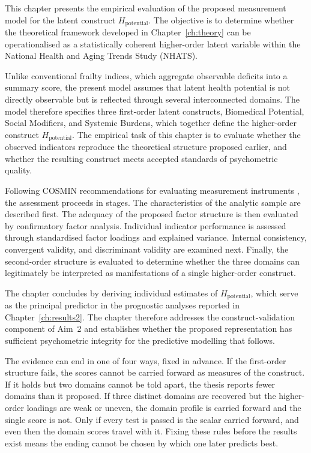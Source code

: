 This chapter presents the empirical evaluation of the proposed measurement model for the latent construct $H_{\text{potential}}$. The objective is to determine whether the theoretical framework developed in Chapter~\ref{ch:theory} can be operationalised as a statistically coherent higher-order latent variable within the National Health and Aging Trends Study (NHATS).

Unlike conventional frailty indices, which aggregate observable deficits into a summary score, the present model assumes that latent health potential is not directly observable but is reflected through several interconnected domains. The model therefore specifies three first-order latent constructs, Biomedical Potential, Social Modifiers, and Systemic Burdens, which together define the higher-order construct $H_{\text{potential}}$. The empirical task of this chapter is to evaluate whether the observed indicators reproduce the theoretical structure proposed earlier, and whether the resulting construct meets accepted standards of psychometric quality.

Following COSMIN recommendations for evaluating measurement instruments \citep{mokkink_2010, mokkink_2018}, the assessment proceeds in stages. The characteristics of the analytic sample are described first. The adequacy of the proposed factor structure is then evaluated by confirmatory factor analysis. Individual indicator performance is assessed through standardised factor loadings and explained variance. Internal consistency, convergent validity, and discriminant validity are examined next. Finally, the second-order structure is evaluated to determine whether the three domains can legitimately be interpreted as manifestations of a single higher-order construct.

The chapter concludes by deriving individual estimates of $H_{\text{potential}}$, which serve as the principal predictor in the prognostic analyses reported in Chapter~\ref{ch:results2}. The chapter therefore addresses the construct-validation component of Aim~2 and establishes whether the proposed representation has sufficient psychometric integrity for the predictive modelling that follows.

The evidence can end in one of four ways, fixed in advance. If the first-order structure fails, the scores cannot be carried forward as measures of the construct. If it holds but two domains cannot be told apart, the thesis reports fewer domains than it proposed. If three distinct domains are recovered but the higher-order loadings are weak or uneven, the domain profile is carried forward and the single score is not. Only if every test is passed is the scalar carried forward, and even then the domain scores travel with it. Fixing these rules before the results exist means the ending cannot be chosen by which one later predicts best.

